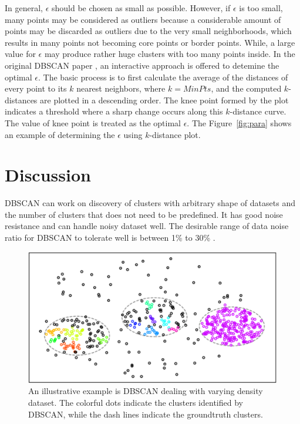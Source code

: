 In general, $\epsilon$ should be chosen as small as possible. However, if 
$\epsilon$ is too small, many points may be considered as outliers because a considerable amount of points may be discarded as outliers due to the very small neighborhoods, which results in many points not becoming core points or border points. While, a large value for $\epsilon$ may produce rather huge clusters with too many points inside.
In the original DBSCAN paper 
\cite{ester1996density}, an interactive approach is offered to detemine the 
optimal 
$\epsilon$.  The basic process is to first calculate the average of the 
distances of every point to its $k$ nearest neighbors, where $k = MinPts$, and 
the computed $k$-distances are plotted in a descending order. The knee point 
formed by the plot indicates a threshold where a sharp change occurs along this 
$k$-distance curve. The value of knee point is treated as the optimal 
$\epsilon$. The Figure~\ref{fig:para} shows an example of determining the 
$\epsilon$ using $k$-distance plot. 



\section{Discussion}

DBSCAN can work on discovery of clusters with arbitrary shape of datasets and 
the number of clusters that does not need to be predefined. It has good noise 
resistance and can handle noisy dataset well. The desirable range of data noise 
ratio for DBSCAN to tolerate well is between 1\% to 30\%
\cite{schubert2017dbscan}. 


\begin{figure}
	\centering
	\includegraphics[width=\textwidth]{"figures/var-density.png"}
	\caption{An illustrative example is DBSCAN dealing with varying density 
	dataset. The colorful dots indicate the clusters identified by DBSCAN, 
	while the dash lines indicate the groundtruth clusters.}
      \label{fig:varying}
\end{figure}

